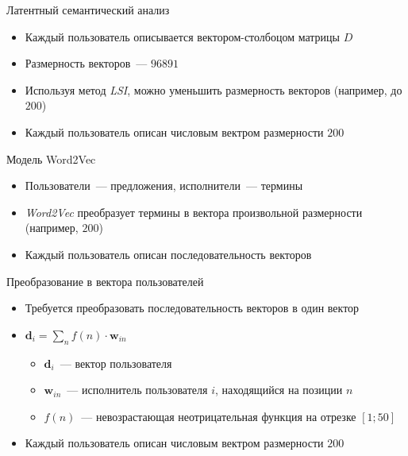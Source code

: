 \documentclass{beamer}
\begin{document}
\begin{frame}{Латентный семантический анализ}
  \begin{itemize}
      \item {Каждый пользователь описывается вектором-столбоцом матрицы $D$}
      \item {Размерность векторов~--- $96891$}
      \item {Используя метод \textit{LSI}, можно уменьшить размерность векторов (например, до $200$)}
      \item {Каждый пользователь описан числовым вектром размерности $200$}
  \end{itemize}
\end{frame}

\begin{frame}{Модель Word2Vec}
  \begin{itemize}
      \item {Пользователи~--- предложения, исполнители~--- термины}
      \item {\textit{Word2Vec} преобразует термины в вектора произвольной размерности (например, $200$)}
      \item {Каждый пользователь описан последовательность векторов} 
  \end{itemize}
\end{frame}

\begin{frame}{Преобразование в вектора пользователей}
  \begin{itemize}
      \item {Требуется преобразовать последовательность векторов в один вектор}
      \item {$\bm{d}_{i} = \sum\limits_{n}{f(n) \cdot \bm{w}_{in}}$}
          \begin{itemize}
              \item {$\bm{d}_{i}$~--- вектор пользователя}
              \item {$\bm{w}_{in}$~--- исполнитель пользователя $i$, находящийся на позиции $n$}
              \item {$f(n)$~--- невозрастающая неотрицательная функция на отрезке $[1; 50]$}
          \end{itemize}
      \item {Каждый пользователь описан числовым вектром размерности $200$}
  \end{itemize}
\end{frame}
\end{document}
